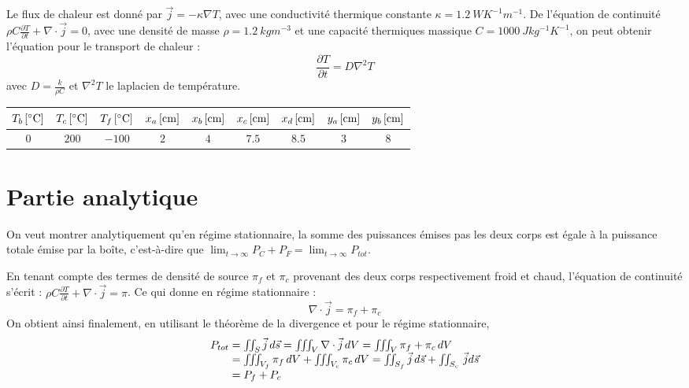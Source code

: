 \documentclass[a4paper,12pt,oneside]{article}
\def \be {\begin{equation}}
\def \ee {\end{equation}}
\begin{document}
Le flux de chaleur est donné par $\Vec{j}=-\kappa \nabla T$, avec une conductivité thermique constante $\kappa=\SI{1.2}{WK^{-1}m^{-1}}$. De l'équation de continuité $\rho C \frac{\partial T}{\partial t} + \nabla \cdot \Vec{j}=0$, avec une densité de masse $\rho=\SI{1.2}{kg m^{-3}}$ et une capacité thermiques massique $C=\SI{1000}{Jkg^{-1}K^{-1}}$, on peut obtenir l'équation pour le transport de chaleur :
\begin{equation}
    \frac{\partial T}{\partial t}=D\nabla^{2}T
    \label{eq:trans}
\end{equation}
avec $D=\frac{k}{\rho C}$ et $\nabla^{2}T$ le laplacien de température.
\begin{center}

\begin{tabular}{|c|c|c|c|c|c|c|c|c|}
\hline
     $T_b \, \rm[^\circ C]$&  $T_c \, \rm[^\circ C]$& $T_f \, \rm[^\circ C]$&$x_a \, \rm[cm]$ & $x_b \, \rm[cm]$ &$x_c \, \rm[cm]$ &$x_d \, \rm[cm]$ &$y_a \, \rm[cm]$ &$y_b \, \rm[cm]$ \\
     \hline
     $0$&$200$ &$-100$&$2$&$4$&$7.5$&$8.5$&$3$&$8$\\
     \hline
\end{tabular}
      \label{Tabnum}
\end{center}

\intextsep=0.5cm



\section{Partie analytique \label{anal}}

On veut montrer analytiquement qu'en régime stationnaire, la somme des puissances émises pas les deux corps est égale à la puissance totale émise par la boîte, c'est-à-dire que $\lim_{t \rightarrow \infty}P_C+P_F=\lim_{t \rightarrow \infty} P_{tot}$.

En tenant compte des termes de densité de source $\pi_f$ et $\pi_c$ provenant des deux corps respectivement froid et chaud, l'équation de continuité s'écrit : $\rho C \frac{\partial T}{\partial t}+ \nabla \cdot \vec{j} = \pi$.
Ce qui donne en régime stationnaire :
\be \nabla \cdot \vec{j} =  \pi_f+\pi_c  \ee
On obtient ainsi finalement, en utilisant le théorème de la divergence et pour le régime stationnaire, 
\be
\begin{array}{r @{{}={}} l}
P_{tot} & \iint_S \vec{j} \, d \vec{s} = \iiint_V \nabla \cdot \vec{j} \, dV = \iiint_V \pi_f + \pi_c \, dV \\ 
        & \iiint_{V_f} \pi_f \, dV +\iiint_{V_c} \pi_c \, dV = \iint_{S_f} \vec{j} \, d \vec{s} + \iint_{S_c} \, \vec{j} d \vec{s} \\ 
        & P_f + P_c
\end{array}
\ee
\end{document}
